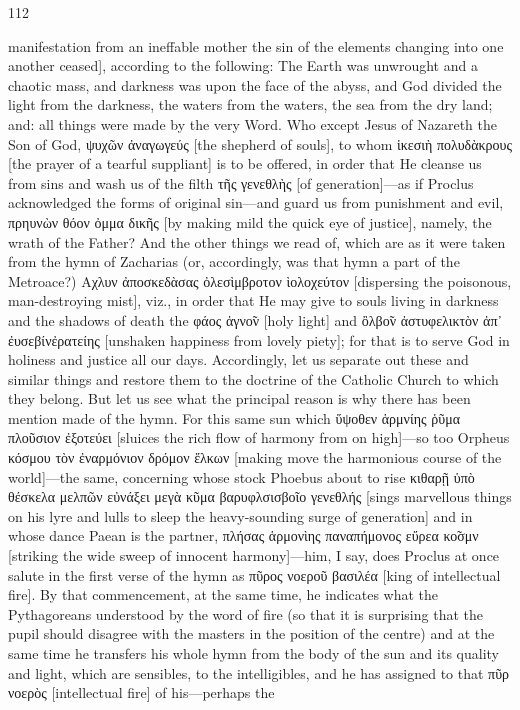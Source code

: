 \documentclass{article}
\begin{document}
112

manifestation from an ineffable mother the sin of the elements changing
into one another ceased], according to the following: The Earth was
unwrought and a chaotic mass, and darkness was upon the face of the
abyss, and God divided the light from the darkness, the waters from the
waters, the sea from the dry land; and: all things were made by the very
Word. Who except Jesus of Nazareth the Son of God, ψυχῶν ἀναγωγεύς
[the shepherd of souls], to whom ἱκεσιὴ πολυδὰκρους [the prayer of a
tearful suppliant] is to be offered, in order that He cleanse us from sins
and wash us of the filth τῆς γενεθλὴς [of generation]—as if Proclus
acknowledged the forms of original sin—and guard us from punishment
and evil, πρηυνὼν θόον ὀμμα δικῆς [by making mild the quick eye of
justice], namely, the wrath of the Father? And the other things we read
of, which are as it were taken from the hymn of Zacharias (or,
accordingly, was that hymn a part of the Metroace?) Αχλυν ἀποσκεδὰσας
ὀλεσὶμβροτον ὶολοχεύτον [dispersing the poisonous, man-destroying
mist], viz., in order that He may give to souls living in darkness and the
shadows of death the φάος ἁγνο̃ν [holy light] and ὂλβο̃ν ἀστυφελικτὸν
ἀπ᾽ ἐυσεβίνἐρατείης [unshaken happiness from lovely piety]; for that is
to serve God in holiness and justice all our days. Accordingly, let us
separate out these and similar things and restore them to the doctrine of
the Catholic Church to which they belong. But let us see what the
principal reason is why there has been mention made of the hymn. For
this same sun which ὕψοθεν ἁρμνίης ῥῦμα πλοῦσιον ἐξοτεύει [sluices the
rich flow of harmony from on high]—so too Orpheus κόσμου τὸν
ἐναρμόνιον δρόμον ἕλκων [making move the harmonious course of the
world]—the same, concerning whose stock Phoebus about to rise κιθαρῇ
ὑπὸ θέσκελα μελπῶν εὐνάξει μεγὰ κῦμα βαρυφλσισβοῖο γενεθλής [sings
marvellous things on his lyre and lulls to sleep the heavy-sounding surge
of generation] and in whose dance Paean is the partner, πλήσας
ἁρμονὶης παναπήμονος εὔρεα κο̃σμν [striking the wide sweep of
innocent harmony]—him, I say, does Proclus at once salute in the first
verse of the hymn as πῦρος νοεροῦ βασιλέα [king of intellectual fire]. By
that commencement, at the same time, he indicates what the
Pythagoreans understood by the word of fire (so that it is surprising that
the pupil should disagree with the masters in the position of the centre)
and at the same time he transfers his whole hymn from the body of the
sun and its quality and light, which are sensibles, to the intelligibles, and
he has assigned to that πῦρ νοερὸς [intellectual fire] of his—perhaps the
\end{document}
